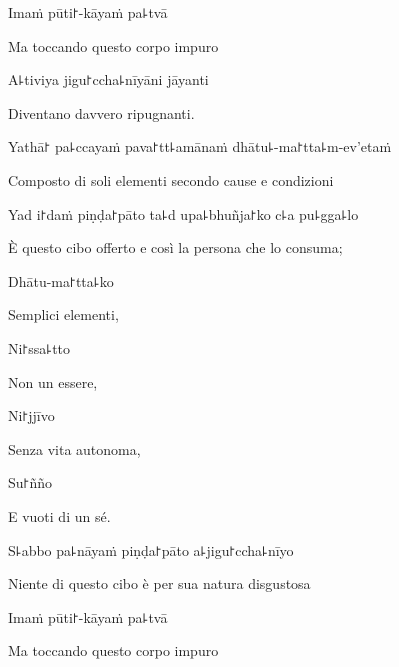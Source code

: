 \clearpage

Imaṁ pūti꜓-kāyaṁ pa꜕tvā

\begin{english}
Ma toccando questo corpo impuro
\end{english}

A꜕tiviya jigu꜓ccha꜕nīyāni jāyanti

\begin{english}
Diventano davvero ripugnanti.
\end{english}

Yathā꜓ pa꜕ccayaṁ pava꜓tt꜕amānaṁ dhātu꜕-ma꜓tta꜕m-ev'etaṁ

\begin{english}
Composto di soli elementi secondo cause e condizioni
\end{english}

Yad i꜓daṁ piṇḍa꜓pāto ta꜕d upa꜕bhuñja꜓ko c꜕a pu꜕gga꜕lo

\begin{english}
È questo cibo offerto e così la persona che lo consuma;
\end{english}

Dhātu-ma꜓tta꜕ko

\begin{english}
Semplici elementi,
\end{english}

Ni꜓ssa꜕tto

\begin{english}
Non un essere,
\end{english}

Ni꜓jjīvo

\begin{english}
Senza vita autonoma,
\end{english}

Su꜓ñño

\begin{english}
E vuoti di un sé.
\end{english}

S꜕abbo pa꜕nāyaṁ piṇḍa꜓pāto a꜕jigu꜓ccha꜕nīyo

\begin{english}
Niente di questo cibo è per sua natura disgustosa
\end{english}

\clearpage

Imaṁ pūti꜓-kāyaṁ pa꜕tvā

\begin{english}
Ma toccando questo corpo impuro
\end{english}

